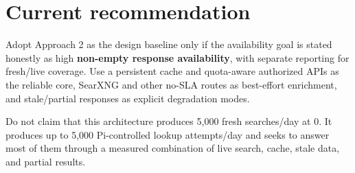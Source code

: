 \documentclass[11pt]{article}
\begin{document}
\section*{Current recommendation}
\label{sec:org8706914}

Adopt Approach 2 as the design baseline only if the availability goal is stated
honestly as high \textbf{non-empty response availability}, with separate reporting for
fresh/live coverage.  Use a persistent cache and quota-aware authorized APIs as
the reliable core, SearXNG and other no-SLA routes as best-effort enrichment,
and stale/partial responses as explicit degradation modes.

Do not claim that this architecture produces 5,000 fresh searches/day at 0.
It produces up to 5,000 Pi-controlled lookup attempts/day and seeks to answer
most of them through a measured combination of live search, cache, stale data,
and partial results.
\end{document}
